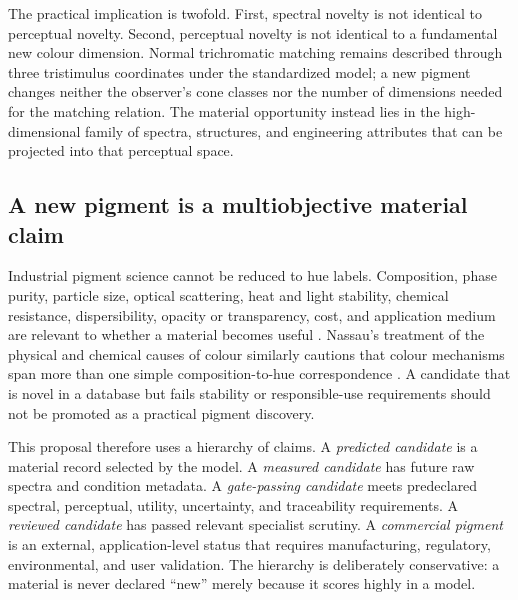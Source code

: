 \documentclass[conference]{IEEEtran}
\begin{document}
The practical implication is twofold. First, spectral novelty is not identical to perceptual novelty. Second, perceptual novelty is not identical to a fundamental new colour dimension. Normal trichromatic matching remains described through three tristimulus coordinates under the standardized model; a new pigment changes neither the observer's cone classes nor the number of dimensions needed for the matching relation. The material opportunity instead lies in the high-dimensional family of spectra, structures, and engineering attributes that can be projected into that perceptual space.

\subsection{A new pigment is a multiobjective material claim}

Industrial pigment science cannot be reduced to hue labels. Composition, phase purity, particle size, optical scattering, heat and light stability, chemical resistance, dispersibility, opacity or transparency, cost, and application medium are relevant to whether a material becomes useful \cite{buxbaum}. Nassau's treatment of the physical and chemical causes of colour similarly cautions that colour mechanisms span more than one simple composition-to-hue correspondence \cite{nassau}. A candidate that is novel in a database but fails stability or responsible-use requirements should not be promoted as a practical pigment discovery.

This proposal therefore uses a hierarchy of claims. A \emph{predicted candidate} is a material record selected by the model. A \emph{measured candidate} has future raw spectra and condition metadata. A \emph{gate-passing candidate} meets predeclared spectral, perceptual, utility, uncertainty, and traceability requirements. A \emph{reviewed candidate} has passed relevant specialist scrutiny. A \emph{commercial pigment} is an external, application-level status that requires manufacturing, regulatory, environmental, and user validation. The hierarchy is deliberately conservative: a material is never declared ``new'' merely because it scores highly in a model.
\end{document}
